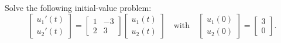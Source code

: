 \documentclass[../book.tex]{subfiles}
\begin{document}
\begin{example} \label{eg:complex1}
Solve the following initial-value problem:
\begin{equation}\label{eq:sys-24}
\begin{bmatrix}
  u_1'(t) \\ u_2'(t)
\end{bmatrix}
=
\begin{bmatrix}
  1 & -3 \\
  2 & 3
\end{bmatrix}
\begin{bmatrix}
  u_1(t) \\ u_2(t)
\end{bmatrix}
\quad \text{with}\quad
\begin{bmatrix}
  u_1(0) \\ u_2(0)
\end{bmatrix}
=
\begin{bmatrix}
  3 \\ 0
\end{bmatrix}.
\end{equation}
\end{example}
\end{document}
